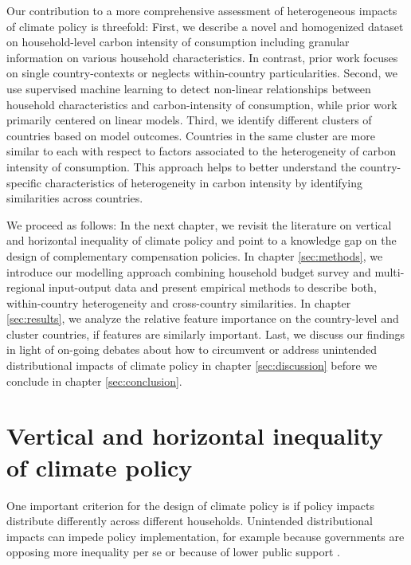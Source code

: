 \documentclass[12pt, a4paper]{article}
\begin{document}
Our contribution to a more comprehensive assessment of heterogeneous impacts of climate policy is threefold: First, we describe a novel and homogenized dataset on household-level carbon intensity of consumption including granular information on various household characteristics. In contrast, prior work focuses on single country-contexts or neglects within-country particularities. Second, we use supervised machine learning to detect non-linear relationships between household characteristics and carbon-intensity of consumption, while prior work primarily centered on linear models. Third, we identify different clusters of countries based on model outcomes. Countries in the same cluster are more similar to each with respect to factors associated to the heterogeneity of carbon intensity of consumption. This approach helps to better understand the country-specific characteristics of heterogeneity in carbon intensity by identifying similarities across countries. 


We proceed as follows: In the next chapter, we revisit the literature on vertical and horizontal inequality of climate policy and point to a knowledge gap on the design of complementary compensation policies. In chapter \ref{sec:methods}, we introduce our modelling approach combining household budget survey and multi-regional input-output data and present empirical methods to describe both, within-country heterogeneity and cross-country similarities. In chapter \ref{sec:results}, we analyze the relative feature importance on the country-level and cluster countries, if features are similarly important. Last, we discuss our findings in light of on-going debates about how to circumvent or address unintended distributional impacts of climate policy in chapter \ref{sec:discussion} before we conclude in chapter \ref{sec:conclusion}.  

\section{Vertical and horizontal inequality of climate policy} \label{sec:literature}

One important criterion for the design of climate policy is if policy impacts distribute differently across different households. Unintended distributional impacts can impede policy implementation, for example because governments are opposing more inequality per se or because of lower public support \autocite{Bergquist.2022,Douenne.2022}. 
\end{document}

